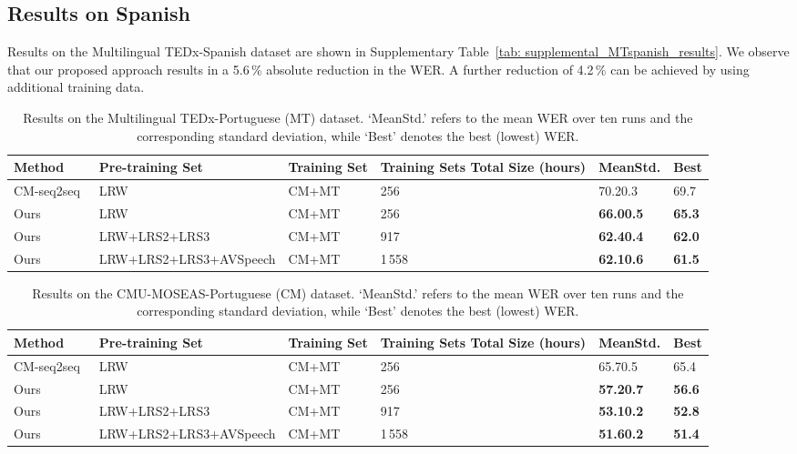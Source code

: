 \documentclass[twocolumn]{article}
\begin{document}
\subsection{Results on Spanish}
Results on the Multilingual TEDx-Spanish dataset are shown in Supplementary Table~\ref{tab: supplemental_MTspanish_results}. We observe that our proposed approach results in a 5.6\,\% absolute reduction in the WER. A further reduction of 4.2\,\% can be achieved by using additional training data.

\begin{table*}[!t]
\centering
\caption{Results on the Multilingual TEDx-Portuguese (MT) dataset. `MeanStd.' refers to the mean WER over ten runs and the corresponding standard deviation, while `Best' denotes the best (lowest) WER.}
\renewcommand\arraystretch{1.4}
\begin{tabularx}{2\columnwidth}{j v k o y y}
\toprule
Method &Pre-training Set &Training Set &Training Sets Total Size (hours) &MeanStd. &Best \\
\midrule
CM-seq2seq~\cite{DBLP:journals/corr/abs-2102-06657} &LRW &CM+MT &256 & 70.20.3 & 69.7 \\
\midrule
Ours &LRW &CM+MT &256 &\bf 66.00.5 &\bf 65.3 \\
\midrule
Ours &LRW+LRS2+LRS3 &CM+MT &917 &\bf 62.40.4 &\bf 62.0 \\
\midrule
Ours &LRW+LRS2+LRS3+AVSpeech &CM+MT &1\,558 &\bf 62.10.6 &\bf 61.5 \\
\bottomrule
\end{tabularx}
\label{tab: supplemental_MTportuguese_results}
\end{table*} \begin{table*}[!t]
\centering
\caption{Results on the CMU-MOSEAS-Portuguese (CM) dataset. `MeanStd.' refers to the mean WER over ten runs and the corresponding standard deviation, while `Best' denotes the best (lowest) WER.}
\renewcommand\arraystretch{1.4}
\begin{tabularx}{2\columnwidth}{j v k o y y}
\toprule
Method &Pre-training Set &Training Set &Training Sets Total Size (hours) &MeanStd. &Best \\
\midrule
CM-seq2seq~\cite{DBLP:journals/corr/abs-2102-06657} &LRW &CM+MT &256 & 65.70.5 & 65.4 \\
\midrule
Ours &LRW &CM+MT &256 &\bf 57.20.7 &\bf 56.6 \\
\midrule
Ours &LRW+LRS2+LRS3 &CM+MT &917 &\bf 53.10.2 &\bf 52.8 \\
\midrule
Ours &LRW+LRS2+LRS3+AVSpeech &CM+MT &1\,558 &\bf 51.60.2 &\bf 51.4 \\

\end{tabularx}
\end{table*}
\end{document}
